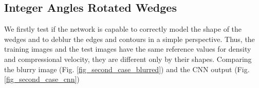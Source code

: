 \documentclass[conference]{IEEEtran}
\begin{document}
\subsection{Integer Angles Rotated Wedges} \label{IARW}
We firstly test if the network is capable to correctly model the shape of the wedges
and to deblur the edges and contours in a simple perspective.
Thus, the training images and the test images have the same reference values for
density and compressional velocity, they are different only by their shapes.
Comparing the blurry image (Fig. \ref{fig_second_case_blurred}) and the CNN output (Fig. \ref{fig_second_case_cnn})
\begin{figure}[!t]
\centering
{}
\end{figure}
\end{document}
